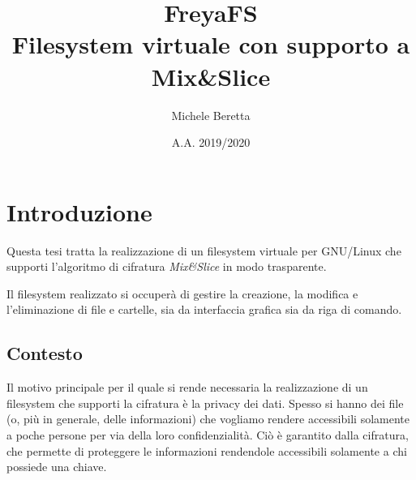 \documentclass[a4paper,12pt,twoside,openright]{report}
\title{%
  \Huge FreyaFS \\
  \Large Filesystem virtuale con supporto a Mix\&Slice
}
\author{Michele Beretta}
\date{A.A. 2019/2020}
\begin{document}
  \thispagestyle{plain}  
  

  \clearpage
  \thispagestyle{plain}
  \mbox{}

  \clearpage
  \maketitle
  
  \clearpage
  \thispagestyle{plain}
  \mbox{}
  
  \clearpage
  \tableofcontents

  \clearpage
  \thispagestyle{plain}
  \mbox{}

  \clearpage
  

  \chapter{Introduzione}
  \thispagestyle{fancy}
  

  Questa tesi tratta la realizzazione di un filesystem virtuale per GNU/Linux che supporti
  l'algoritmo di cifratura \textit{Mix\&Slice} in modo trasparente.

  Il filesystem realizzato si occuperà di gestire la creazione, la modifica e l'eliminazione di file e cartelle,
  sia da interfaccia grafica sia da riga di comando.

  \section{Contesto}

  Il motivo principale per il quale si rende necessaria la realizzazione di un filesystem che supporti
  la cifratura è la privacy dei dati.
  Spesso si hanno dei file (o, più in generale, delle informazioni) che vogliamo rendere accessibili solamente
  a poche persone per via della loro confidenzialità. Ciò è garantito dalla cifratura, che permette di proteggere
  le informazioni rendendole accessibili solamente a chi possiede una chiave.
\end{document}
